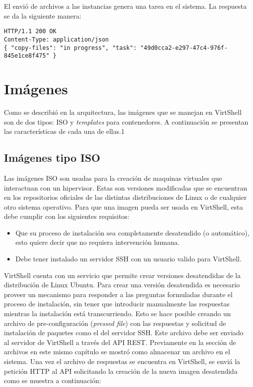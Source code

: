 \vspace{5mm}

El envió de archivos a las instancias genera una tarea en el sistema. La respuesta se da la siguiente manera:

\vspace{5mm}

\begin{lstlisting}[style=json, caption=Ejemplo de respuesta HTTP para el envio de archivos]
HTTP/1.1 200 OK
Content-Type: application/json
{ "copy-files": "in progress", "task": "49d0cca2-e297-47c4-976f-845e1ce8f475" }
\end{lstlisting}


\section{Imágenes}
Como se describió en la arquitectura, las imágenes que se manejan en VirtShell son de dos tipos: ISO y \emph{templates} para contenedores. A continuación se presentan las características de cada una de ellas.1

\subsection{Imágenes tipo ISO}
Las imágenes ISO son usadas para la creación de maquinas virtuales que interactuan con un hipervisor. Estas son versiones modificadas que se encuentran en los repositorios oficiales de las distintas distribuciones de Linux o de cualquier otro sistema operativo. Para que una imagen pueda ser usada en VirtShell, esta debe cumplir con los siguientes requisitos: 
\begin{itemize}
\item Que su proceso de instalación sea completamente desatendido (o automático), esto quiere decir que no requiera intervención humana.
\item Debe tener instalado un servidor SSH con un usuario valido para VirtShell.
\end{itemize}

VirtShell cuenta con un servicio que permite crear versiones desatendidas de la distribución de Linux Ubuntu. Para crear una versión desatendida es necesario proveer un mecanismo para responder a las preguntas formuladas durante el proceso de instalación, sin tener que introducir manualmente las respuestas mientras la instalación está transcurriendo. Esto se hace posible creando un archivo de pre-configuración (\emph{pressed file}) con las respuestas y solicitud de instalación de paquetes como el del servidor SSH. Este archivo debe ser enviado al servidor de VirtShell a través del API REST. Previamente en la sección de archivos en este mismo capítulo se mostró como almacenar un archivo en el sistema. Una vez el archivo de respuestas se encuentra en VirtShell, se enviá la petición HTTP al API solicitando la creación de la nueva imagen desatendida como se muestra a continuación:

